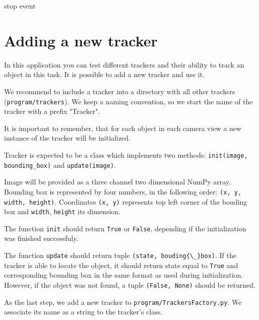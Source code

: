 stop event

\section{Adding a new tracker}
In this application you can test different trackers and their ability to track
an object in this task. It is possible to add a new tracker and use it.

We recommend to include a tracker into a directory with all other trackers
(\verb+program/trackers+). We keep a naming convention, so we start the name of
the tracker with a prefix "Tracker".

It is important to remember, that for each object in each camera view a new
instance of the tracker will be initialized.

Tracker is expected to be a class which implements two methods:
\verb+init(image, bounding_box)+ and \verb+update(image)+.

Image will be provided as a three channel two dimensional NumPy array. Bounding
box is represented by four numbers, in the following order:
\verb+(x, y, width, height)+. Coordinates \verb+(x, y)+ represents top left corner of the bouding
box and \verb+width+, \verb+height+ its dimension.

The function \verb+init+ should return \verb+True+ or \verb+False+, depending
if the initialization was finished successfuly.

The function \verb+update+ should return tuple \verb+(state, bouding{\_}box)+.
If the tracker is able to locate the object, it should return state equal to
\verb+True+ and corresponding bounding box in the same format as used during
initialization. However, if the object was not found, a tuple \verb+(False, None)+ should be returned.

As the last step, we add a new tracker to \verb+program/TrackersFactory.py+. We
associate its name as a string to the tracker's class.
